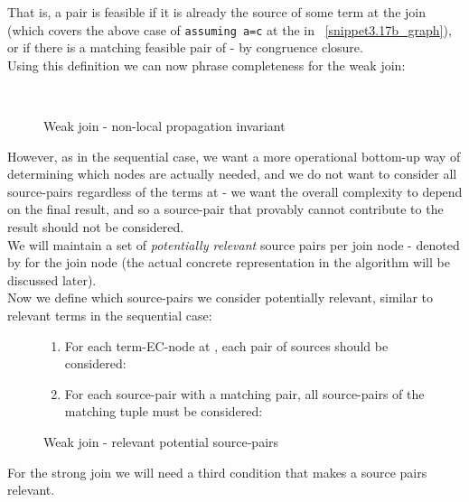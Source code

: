 That is, a pair is feasible if it is already the source of some term at the join (which covers the above case of \lstinline{assuming a=c} at the  in ~\ref{snippet3.17b_graph}), or if there is a matching feasible pair of \GFAs{} - by congruence closure.\\
Using this definition we can now phrase \GFA{} completeness for the weak join:
\begin{figure}[H]
\\
\caption{Weak join - non-local propagation invariant}
\end{figure}
However, as in the sequential case, we want a more operational bottom-up way of determining which nodes are actually needed, and we do not want to consider all  source-pairs regardless of the terms at  - 
we want the overall complexity to depend on the final result, and so a source-pair that provably cannot contribute to the result should not be considered.\\
We will maintain a set of \emph{potentially relevant} source pairs per join node - denoted by  for the join node  (the actual concrete representation in the algorithm will be discussed later).\\
Now we define which source-pairs we consider potentially relevant, similar to relevant terms in the sequential case:
\begin{figure}[H]
\begin{enumerate}
	\item For each term-EC-node at , each pair of sources should be considered:\\
	\item For each source-pair with a matching \gfa pair, all source-pairs of the matching tuple must be considered:\\
\end{enumerate}
\caption{Weak join - relevant potential source-pairs}
\label{wj_relevant_potential_source_pairs}
\end{figure}
For the strong join we will need a third condition that makes a source pairs relevant.\\
